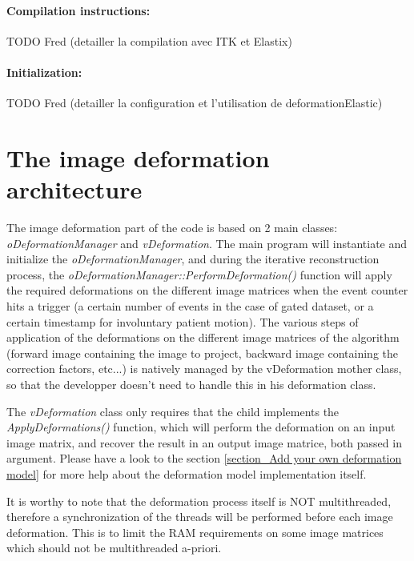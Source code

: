 \documentclass[a4paper, 11pt]{article}
\begin{document}
\color{red}
\paragraph{Compilation instructions:} TODO Fred (detailler la compilation avec ITK et Elastix)


\paragraph{Initialization:} TODO Fred (detailler la configuration et l'utilisation de deformationElastic)
\color{black}


\clearpage
\section{The image deformation architecture}

The image deformation part of the code is based on 2 main classes: \textit{oDeformationManager} and \textit{vDeformation}. The main program will instantiate and initialize the \textit{oDeformationManager}, and during the iterative reconstruction process, the \textit{oDeformationManager::PerformDeformation()} function will apply the required deformations on the different image matrices when the event counter hits a trigger (a certain number of events in the case of gated dataset, or a certain timestamp for involuntary patient motion). The various steps of application of the deformations on the different image matrices of the algorithm (forward image containing the image to project, backward image containing the correction factors, etc...) is natively managed by the vDeformation mother class, so that the developper doesn't need to handle this in his deformation class. 

The \textit{vDeformation} class only requires that the child implements the \textit{ApplyDeformations()} function, which will perform the deformation on an input image matrix, and recover the result in an output image matrice, both passed in argument. Please have a look to the section \ref{section_Add your own deformation model} for more help about the deformation model implementation itself.

It is worthy to note that the deformation process itself is NOT multithreaded, therefore a synchronization of the threads will be performed before each image deformation. This is to limit the RAM requirements on some image matrices which should not be multithreaded a-priori. 
\end{document}

